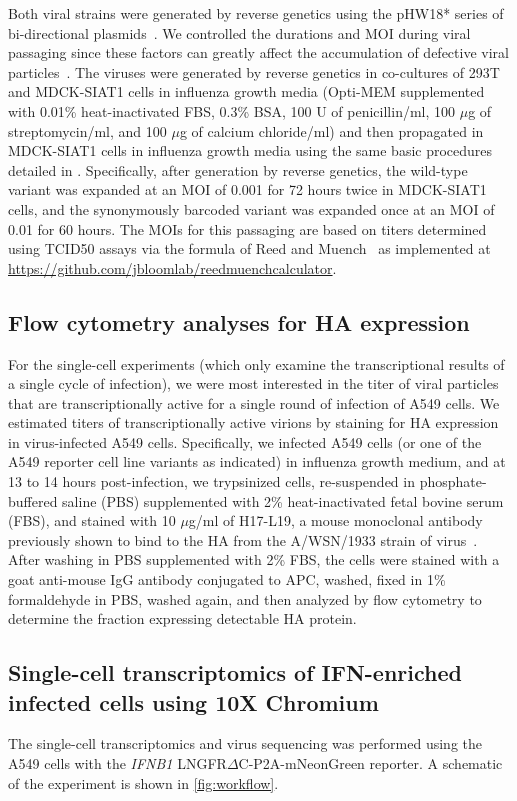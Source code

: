 \documentclass[10pt,letterpaper]{article}
\newcommand{\FIG}[1]{\autoref{fig:#1}}
\begin{document}
Both viral strains were generated by reverse genetics using the pHW18* series of bi-directional plasmids~\cite{hoffmann2000dna}.
We controlled the durations and MOI during viral passaging since these factors can greatly affect the accumulation of defective viral particles~\cite{xue2016propagation}.
The viruses were generated by reverse genetics in co-cultures of 293T and MDCK-SIAT1 cells in influenza growth media (Opti-MEM supplemented with 0.01\% heat-inactivated FBS, 0.3\% BSA, 100 U of penicillin/ml, 100 $\mu$g of streptomycin/ml, and 100 $\mu$g of calcium chloride/ml) and then propagated in MDCK-SIAT1 cells in influenza growth media using the same basic procedures detailed in \cite{russell2018extreme}.
Specifically, after generation by reverse genetics, the wild-type variant was expanded at an MOI of 0.001 for 72 hours twice in MDCK-SIAT1 cells, and the synonymously barcoded variant was expanded once at an MOI of 0.01 for 60 hours.
The MOIs for this passaging are based on titers determined using TCID50 assays via the formula of Reed and Muench~\cite{reed1938simple} as implemented at \url{https://github.com/jbloomlab/reedmuenchcalculator}.

\subsection*{Flow cytometry analyses for HA expression}
For the single-cell experiments (which only examine the transcriptional results of a single cycle of infection), we were most interested in the titer of viral particles that are transcriptionally active for a single round of infection of A549 cells.
We estimated titers of transcriptionally active virions by staining for HA expression in virus-infected A549 cells.
Specifically, we infected A549 cells (or one of the A549 reporter cell line variants as indicated) in influenza growth medium, and at 13 to 14 hours post-infection, we trypsinized cells, re-suspended in phosphate-buffered saline (PBS) supplemented with 2\% heat-inactivated fetal bovine serum (FBS), and stained with 10 $\mu$g/ml of H17-L19, a mouse monoclonal antibody previously shown to bind to the HA from the A/WSN/1933 strain of virus~\cite{doud2017complete}.
After washing in PBS supplemented with 2\% FBS, the cells were stained with a goat anti-mouse IgG antibody conjugated to APC, washed, fixed in 1\% formaldehyde in PBS, washed again, and then analyzed by flow cytometry to determine the fraction expressing detectable HA protein.

\subsection*{Single-cell transcriptomics of IFN-enriched infected cells using 10X Chromium}
The single-cell transcriptomics and virus sequencing was performed using the A549 cells with the \textit{IFNB1} LNGFR$\Delta$C-P2A-mNeonGreen reporter.
A schematic of the experiment is shown in \FIG{workflow}.
\end{document}
